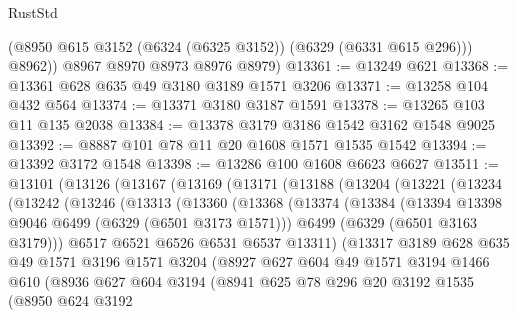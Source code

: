 \begin{lexlean}{RustStd}
\begin{coremodule}
{\begin{coremodule}
{{{{{{{{{{{{{{{{{{{{{{{{{{{{{{{{{{{          (@8950 @615 @3152 (@6324 (@6325 @3152)) (@6329 (@6331 @615 @296)))
          @8962))
      @8967
      @8970
      @8973
      @8976
      @8979)
@13361 := @13249 @621
@13368 := @13361 @628 @635 @49 @3180 @3189 @1571 @3206
@13371 := @13258 @104 @432 @564
@13374 := @13371 @3180 @3187 @1591
@13378 := @13265 @103 @11 @135 @2038
@13384 := @13378 @3179 @3186 @1542 @3162 @1548 @9025
@13392 := @8887 @101 @78 @11 @20 @1608 @1571 @1535 @1542
@13394 := @13392 @3172 @1548
@13398 := @13286 @100 @1608 @6623 @6627
@13511 := @13101
    (@13126
      (@13167
        (@13169
          (@13171
            (@13188
              (@13204
                (@13221
                  (@13234
                    (@13242
                      (@13246
                        (@13313
                          (@13360
                            (@13368
                              (@13374
                                (@13384
                                  (@13394 @13398 @9046 @6499 (@6329 (@6501 @3173 @1571)))
                                  @6499
                                  (@6329 (@6501 @3163 @3179)))
                                @6517
                                @6521
                                @6526
                                @6531
                                @6537
                                @13311)
                              (@13317
                                @3189
                                @628
                                @635
                                @49
                                @1571
                                @3196
                                @1571
                                @3204
                                (@8927
                                  @627
                                  @604
                                  @49
                                  @1571
                                  @3194
                                  @1466
                                  @610
                                  (@8936
                                    @627
                                    @604
                                    @3194
                                    (@8941
                                      @625
                                      @78
                                      @296
                                      @20
                                      @3192
                                      @1535
                                      (@8950
                                        @624
                                        @3192
}}}}}}}}}}}}}}}}}}}}}}}}}}}}}}}}}}}
\end{coremodule}}
\end{coremodule}
\end{lexlean}
